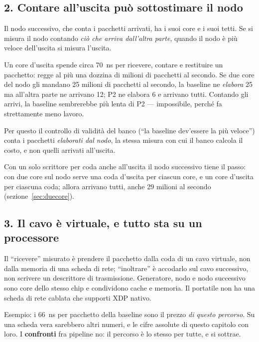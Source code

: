 \documentclass[11pt,a4paper,oneside]{report}
\begin{document}
\subsection*{2. Contare all'uscita può sottostimare il nodo}

Il nodo successivo, che conta i pacchetti arrivati, ha i suoi core e i suoi
tetti. Se si misura il nodo contando \emph{ciò che arriva dall'altra parte},
quando il nodo è più veloce dell'uscita si misura l'uscita.

\begin{prima}
Un core d'uscita spende circa 70~ns per ricevere, contare e restituire un
pacchetto: regge al più una dozzina di milioni di pacchetti al secondo. Se due
core del nodo gli mandano 25 milioni di pacchetti al secondo, la baseline ne
\emph{elabora} 25 ma all'altra parte ne arrivano 12; P2 ne elabora 6 e arrivano
tutti. Contando gli arrivi, la baseline sembrerebbe più lenta di P2 ---
impossibile, perché fa strettamente meno lavoro.

Per questo il controllo di validità del banco (``la baseline dev'essere la più
veloce'') conta i pacchetti \emph{elaborati dal nodo}, la stessa misura con cui
il banco calcola il costo, e non quelli arrivati all'uscita.
\end{prima}

Con un solo scrittore per coda anche all'uscita il nodo successivo tiene il passo:
con due core sul nodo serve una coda d'uscita per ciascun core, e un core d'uscita
per ciascuna coda; allora arrivano tutti, anche 29 milioni al secondo
(sezione~\ref{sec:duecore}).

\subsection*{3. Il cavo è virtuale, e tutto sta su un processore}

Il ``ricevere'' misurato è prendere il pacchetto dalla coda di un cavo virtuale,
non dalla memoria di una scheda di rete; ``inoltrare'' è accodarlo sul cavo
successivo, non scrivere un descrittore di trasmissione. Generatore, nodo e nodo
successivo sono core dello stesso chip e condividono cache e memoria. Il portatile
non ha una scheda di rete cablata che supporti XDP nativo.

Esempio: i 66~ns per pacchetto della baseline sono il prezzo \emph{di questo
percorso}. Su una scheda vera sarebbero altri numeri, e le cifre assolute di
questo capitolo con loro. I \textbf{confronti} fra pipeline no: il percorso è lo
stesso per tutte, e si sottrae.
\end{document}
